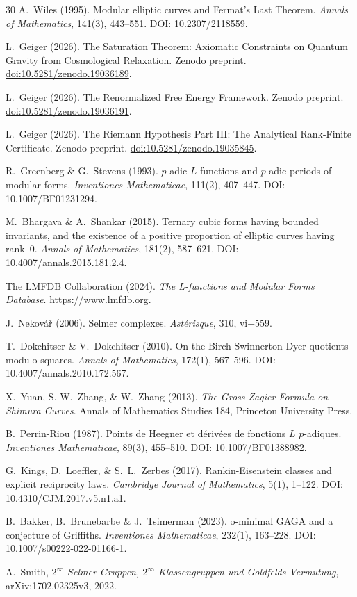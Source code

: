 \documentclass[aps,prd,twocolumn,superscriptaddress,nofootinbib]{revtex4-2}
\theoremstyle{definition}
\theoremstyle{remark}
\begin{document}
\begin{thebibliography}{30}
A.~Wiles (1995).
Modular elliptic curves and Fermat's Last Theorem.
\textit{Annals of Mathematics}, 141(3), 443--551.
DOI: 10.2307/2118559.

L.~Geiger (2026).
The Saturation Theorem: Axiomatic Constraints on Quantum Gravity from Cosmological Relaxation.
Zenodo preprint.
\href{https://doi.org/10.5281/zenodo.19036189}{doi:10.5281/zenodo.19036189}.

L.~Geiger (2026).
The Renormalized Free Energy Framework.
Zenodo preprint.
\href{https://doi.org/10.5281/zenodo.19036191}{doi:10.5281/zenodo.19036191}.

L.~Geiger (2026).
The Riemann Hypothesis Part III: The Analytical Rank-Finite Certificate.
Zenodo preprint.
\href{https://doi.org/10.5281/zenodo.19035845}{doi:10.5281/zenodo.19035845}.

R.~Greenberg \& G.~Stevens (1993).
$p$-adic $L$-functions and $p$-adic periods of modular forms.
\textit{Inventiones Mathematicae}, 111(2), 407--447.
DOI: 10.1007/BF01231294.

M.~Bhargava \& A.~Shankar (2015).
Ternary cubic forms having bounded invariants, and the existence of a positive proportion of elliptic curves having rank~0.
\textit{Annals of Mathematics}, 181(2), 587--621.
DOI: 10.4007/annals.2015.181.2.4.

The LMFDB Collaboration (2024).
\textit{The L-functions and Modular Forms Database}.
\url{https://www.lmfdb.org}.

J.~Nekov\'a\v{r} (2006).
Selmer complexes.
\textit{Ast\'erisque}, 310, vi+559.

T.~Dokchitser \& V.~Dokchitser (2010).
On the Birch-Swinnerton-Dyer quotients modulo squares.
\textit{Annals of Mathematics}, 172(1), 567--596.
DOI: 10.4007/annals.2010.172.567.

X.~Yuan, S.-W.~Zhang, \& W.~Zhang (2013).
\textit{The Gross-Zagier Formula on Shimura Curves}.
Annals of Mathematics Studies 184, Princeton University Press.

B.~Perrin-Riou (1987).
Points de Heegner et d\'eriv\'ees de fonctions $L$ $p$-adiques.
\textit{Inventiones Mathematicae}, 89(3), 455--510.
DOI: 10.1007/BF01388982.

G.~Kings, D.~Loeffler, \& S.~L.~Zerbes (2017).
Rankin-Eisenstein classes and explicit reciprocity laws.
\textit{Cambridge Journal of Mathematics}, 5(1), 1--122.
DOI: 10.4310/CJM.2017.v5.n1.a1.

B.~Bakker, B.~Brunebarbe \& J.~Tsimerman (2023).
o-minimal GAGA and a conjecture of Griffiths.
\textit{Inventiones Mathematicae}, 232(1), 163--228.
DOI: 10.1007/s00222-022-01166-1.

A.~Smith, \textit{$2^\infty$-Selmer-Gruppen, $2^\infty$-Klassengruppen und Goldfelds Vermutung}, arXiv:1702.02325v3, 2022.

\end{thebibliography}
\end{document}
